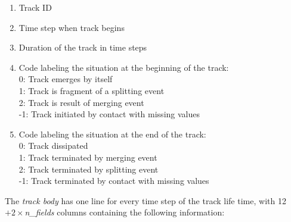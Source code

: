 \documentclass[11pt]{article}
\begin{document}
\begin{enumerate}
\item Track ID
\item Time step when track begins
\item Duration of the track in time steps
\item Code labeling the situation at the beginning of the track:\\
0: Track emerges by itself\\
1: Track is fragment of a splitting event\\
2: Track is result of merging event\\
-1: Track initiated by contact with missing values
\item Code labeling the situation at the end of the track:\\
0: Track dissipated\\
1: Track terminated by merging event\\
2: Track terminated by splitting event\\
-1: Track terminated by contact with missing values
\end{enumerate}
The {\it track body} has one line for every time step of the track life time, with 12$+2\times${\it n\_fields} columns containing the following information:
\end{document}
